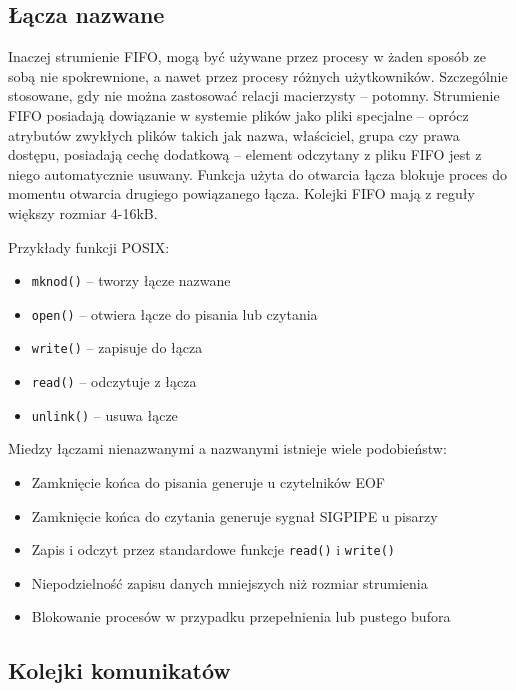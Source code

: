 \subsection{Łącza nazwane}

Inaczej strumienie FIFO, mogą być używane przez procesy w żaden sposób ze sobą nie spokrewnione, a nawet przez procesy różnych użytkowników. Szczególnie stosowane, gdy nie można zastosować relacji macierzysty -- potomny. Strumienie FIFO posiadają dowiązanie w systemie plików jako pliki specjalne -- oprócz atrybutów zwykłych plików takich jak nazwa, właściciel, grupa czy prawa dostępu, posiadają cechę dodatkową -- element odczytany z pliku FIFO jest z niego automatycznie usuwany. Funkcja użyta do otwarcia łącza blokuje proces do momentu otwarcia drugiego powiązanego łącza. Kolejki FIFO mają z reguły większy rozmiar 4-16kB.

Przykłady funkcji POSIX:
\begin{itemize}
	\item \texttt{mknod()} -- tworzy łącze nazwane
    \item \texttt{open()} -- otwiera łącze do pisania lub czytania
    \item \texttt{write()} -- zapisuje do łącza
    \item \texttt{read()} -- odczytuje z łącza
    \item \texttt{unlink()} -- usuwa łącze
\end{itemize}

\newpage

Miedzy łączami nienazwanymi a nazwanymi istnieje wiele podobieństw:
\begin{itemize}
	\item Zamknięcie końca do pisania generuje u czytelników EOF
    \item Zamknięcie końca do czytania generuje sygnał SIGPIPE u pisarzy
    \item Zapis i odczyt przez standardowe funkcje \texttt{read()} i \texttt{write()}
    \item Niepodzielność zapisu danych mniejszych niż rozmiar strumienia
    \item Blokowanie procesów w przypadku przepełnienia lub pustego bufora
\end{itemize}

\subsection{Kolejki komunikatów}

